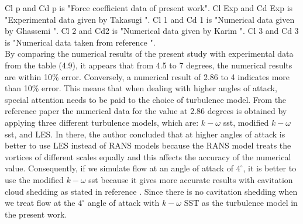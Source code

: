 Cl p and Cd p is "Force coefficient data of present work".
Cl Exp and Cd Exp is "Experimental data given by Takasugi \cite{Zhao2021}".
Cl 1 and Cd 1 is "Numerical data given by Ghassemi \cite{Zhao2021}".
Cl 2 and Cd2 is "Numerical data given by Karim \cite{Zhao2021}".
Cl 3 and Cd 3 is "Numerical data taken from reference \cite{Zhao2021}".\\

By comparing the numerical results of the present study with experimental data from the table (4.9), 
it appears that from 4.5 to 7 degrees, the numerical results are within 
10\% error. Conversely, a numerical result of 2.86 to 4 indicates more than 10\% error. 
This means that when dealing with higher angles of attack, special attention needs to be 
paid to the choice of turbulence model. From the reference paper \cite{Zhao2021} the numerical data for the value at 2.86 degrees is obtained by applying three different turbulence models, which are: $k- \omega$ sst, modified $k - \omega$ sst, and LES. In there, the author concluded that at higher angles of attack is better to use LES instead of RANS models because the RANS model treats the vortices of different scales equally and this affects the accuracy of the numerical value. Consequently, if we simulate flow at an angle of attack of $4^{\circ}$, it is better to use the modified $k- \omega$ sst because it gives more accurate results with cavitation cloud shedding as stated in reference \cite{Zhao2021}. Since there is no cavitation shedding when we treat flow at the $4^{\circ}$ angle of attack with $k- \omega$ SST as the turbulence model in the present work.

